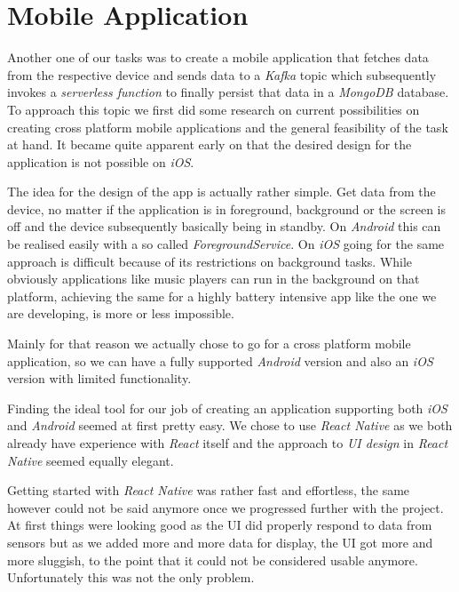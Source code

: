 \section{Mobile Application}

Another one of our tasks was to create a mobile application that fetches data from the respective
device and sends data to a \textit{Kafka} topic which subsequently invokes a \textit{serverless
function} to finally persist that data in a \textit{MongoDB} database. To approach this topic we
first did some research on current possibilities on creating cross platform mobile applications and
the general feasibility of the task at hand. It became quite apparent early on that the desired
design for the application is not possible on \textit{iOS}.

The idea for the design of the app is actually rather simple. Get data from the device, no matter if
the application is in foreground, background or the screen is off and the device subsequently
basically being in standby. On \textit{Android} this can be realised easily with a so called
\textit{ForegroundService}. On \textit{iOS} going for the same approach is difficult because of its
restrictions on background tasks. While obviously applications like music players can run in the
background on that platform, achieving the same for a highly battery intensive app like the one we
are developing, is more or less impossible.

Mainly for that reason we actually chose to go for a cross platform mobile application, so we can
have a fully supported \textit{Android} version and also an \textit{iOS} version with limited
functionality.

Finding the ideal tool for our job of creating an application supporting both \textit{iOS} and
\textit{Android} seemed at first pretty easy. We chose to use \textit{React Native}
\cite{react-native} as we both already have experience with \textit{React} \cite{react} itself and
the approach to \textit{UI design} in \textit{React Native} seemed equally elegant.

Getting started with \textit{React Native} was rather fast and effortless, the same however could
not be said anymore once we progressed further with the project. At first things were looking good
as the UI did properly respond to data from sensors but as we added more and more data for
display, the UI got more and more sluggish, to the point that it could not be considered usable
anymore. Unfortunately this was not the only problem.

